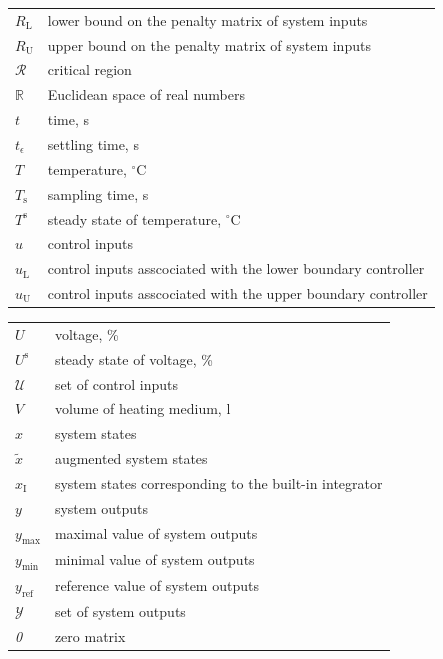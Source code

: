 \documentclass[preprint,12pt]{elsarticle}
\begin{document}
\begin{center}
\begin{tabular}{ l l }
$R_{\mathrm{L}}$ & lower bound on the penalty matrix of system inputs \\
$R_{\mathrm{U}}$ & upper bound on the penalty matrix of system inputs \\
$\mathcal{R}$ & critical region \\
$\mathbb{R}$ & Euclidean space of real numbers \\
$t$ & time, s \\
$t_{\epsilon}$ & settling time, s \\
$T$ & temperature, $^{\circ}\mathrm{C}$ \\
$T_{\mathrm{s}}$ & sampling time, s \\
$T^{\mathrm{s}}$ & steady state of temperature, $^{\circ}\mathrm{C}$ \\
$u$ & control inputs \\
$u_{\mathrm{L}}$ & control inputs asscociated with the lower boundary controller\\
$u_{\mathrm{U}}$ & control inputs asscociated with the upper boundary controller\\
\end{tabular}
\end{center}


\begin{center}
	\begin{tabular}{ l l }
$U$ & voltage, \% \\
$U^{\mathrm{s}}$ & steady state of voltage, \% \\
$\mathcal{U}$ & set of control inputs \\
$V$ & volume of heating medium, l \\
$x$ & system states \\
$\widetilde{x}$ & augmented system states \\
$x_{\mathrm{I}}$ & system states corresponding to the built-in integrator \\
$y$ & system outputs \\
$y_\mathrm{\max}$ & maximal value of system outputs \\
$y_\mathrm{\min}$ & minimal value of system outputs \\
$y_\mathrm{ref}$ & reference value of system outputs \\	
$\mathcal{Y}$ & set of system outputs \\
\textit{0} & zero matrix
\end{tabular}
\end{center}
\end{document}
